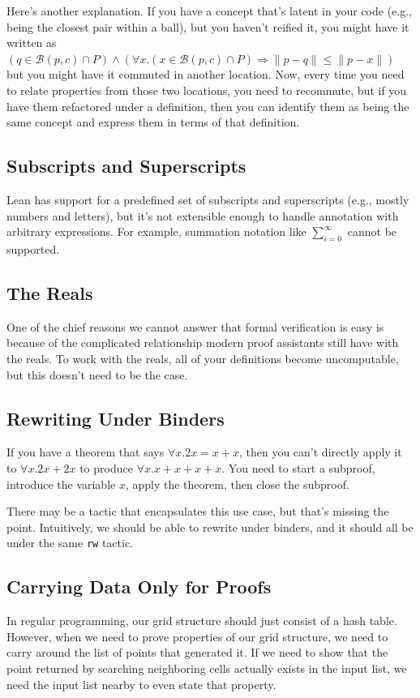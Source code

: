 \documentclass{article}
\begin{document}
Here's another explanation.
If you have a concept that's latent in your code (e.g., being the closest pair within a ball), but you haven't reified it, you might have it written as $(q \in \mathcal{B}(p, c) \cap P) \wedge (\forall x. (x \in \mathcal{B}(p, c) \cap P) \Rightarrow \| p - q \| \leq \| p - x \|)$ but you might have it commuted in another location.
Now, every time you need to relate properties from those two locations, you need to recommute, but if you have them refactored under a definition, then you can identify them as being the same concept and express them in terms of that definition.

\subsection{Subscripts and Superscripts}
Lean has support for a predefined set of subscripts and superscripts (e.g., mostly numbers and letters), but it's not extensible enough to handle annotation with arbitrary expressions.
For example, summation notation like $\sum_{i=0}^{\infty}$ cannot be supported.

\subsection{The Reals}
One of the chief reasons we cannot answer that formal verification is easy is because of the complicated relationship modern proof assistants still have with the reals.
To work with the reals, all of your definitions become uncomputable, but this doesn't need to be the case.

\subsection{Rewriting Under Binders}
If you have a theorem that says $\forall x. 2x = x + x$, then you can't directly apply it to $\forall x. 2x + 2x$ to produce $\forall x. x + x + x + x$.
You need to start a subproof, introduce the variable $x$, apply the theorem, then close the subproof.

There may be a tactic that encapsulates this use case, but that's missing the point.
Intuitively, we should be able to rewrite under binders, and it should all be under the same \texttt{rw} tactic.

\subsection{Carrying Data Only for Proofs}
In regular programming, our grid structure should just consist of a hash table.
However, when we need to prove properties of our grid structure, we need to carry around the list of points that generated it.
If we need to show that the point returned by searching neighboring cells actually exists in the input list, we need the input list nearby to even state that property.
\end{document}
